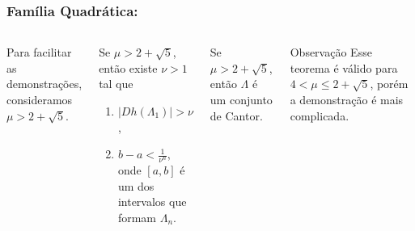 
\begin{frame}
\vspace{5pt}
\frametitle{Família Quadrática: \subsecname}
\begin{columns}
\column{\dimexpr\paperwidth-15pt}

Para facilitar as demonstrações, consideramos $\mu > 2 + \sqrt{5}$.

\begin{lemma}
Se $\mu > 2 + \sqrt{5}$, então existe $\nu > 1$ tal que
\begin{enumerate}
\item  $|D h(\Lambda_1)| > \nu$,
\item $b - a < \frac{1}{\nu^n}$, onde $[a, b]$ é um dos intervalos que formam $\Lambda_n$.
\end{enumerate}
\end{lemma}

\vspace{10pt}

\begin{theorem}
Se $\mu > 2 + \sqrt{5}$, então $\Lambda$ é um conjunto de Cantor.
\end{theorem}

\begin{block}{Observação}
Esse teorema é válido para $4 < \mu \leq 2 + \sqrt{5}$, porém a demonstração é mais complicada.
\end{block}

\end{columns}
\end{frame}
